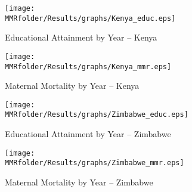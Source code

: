 \begin{subfigures}
\begin{figure}[h!]
\begin{center}
\caption{Educational Attainment by Year -- Kenya}
\label{fig:Kenyaaeduc}
\texttt{[image: \\MMRfolder/Results/graphs/Kenya\_educ.eps]} 
\end{center}
\end{figure}

\begin{figure}[h!]
\begin{center}
\caption{Maternal Mortality by Year -- Kenya}
\label{fig:Kenyammr}
\texttt{[image: \\MMRfolder/Results/graphs/Kenya\_mmr.eps]} 
\end{center}
\end{figure}
\end{subfigures}

\begin{subfigures}
\begin{figure}[h!]
\begin{center}
\caption{Educational Attainment by Year -- Zimbabwe}
\label{fig:Zimbabweeduc}
\texttt{[image: \\MMRfolder/Results/graphs/Zimbabwe\_educ.eps]} 
\end{center}
\end{figure}

\begin{figure}[h!]
\begin{center}
\caption{Maternal Mortality by Year -- Zimbabwe}
\label{fig:Zimbabwemmr}
\texttt{[image: \\MMRfolder/Results/graphs/Zimbabwe\_mmr.eps]} 
\end{center}
\end{figure}
\end{subfigures}
